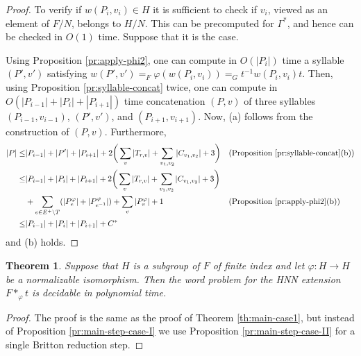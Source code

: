 \documentclass[12pt,oneside]{amsart}
\newtheorem{theorem}{Theorem}[section]
\theoremstyle{definition}
\theoremstyle{case}
\newcommand{\sasha}[1]{\todo[inline,color=green]{\footnotesize SU: #1}}
\newcommand{\hanwen}[1]{\todo[inline,color=cyan]{\footnotesize Hanwen: #1}}
\begin{document}
\begin{proof}
To verify if $w(P_i,v_i) \in H$ it is sufficient to check if $v_i$, 
viewed as an element of $F/N$, belongs to $H/N$.
This can be precomputed for $\Gamma^\ast$, and hence can be checked in 
$O(1)$ time. Suppose that it is the case.

Using Proposition \ref{pr:apply-phi2}, one can compute in $O(|P_i|)$ time
a syllable $(P',v')$ satisfying
$w(P',v') =_F \varphi(w(P_i,v_i)) =_G t^{-1} w(P_{i},v_{i}) t$.
Then, using Proposition \ref{pr:syllable-concat} twice, one can compute 
in $O(|P_{i-1}|+|P_{i}|+|P_{i+1}|)$ time
concatenation $(P,v)$ of 
three syllables $(P_{i-1},v_{i-1})$, $(P',v')$, 
and $(P_{i+1},v_{i+1})$.
Now, (a) follows from the construction of $(P,v)$.
Furthermore,
\begin{align*}
|P| \le& |P_{i-1}| + |P'| + |P_{i+1}| +
2\bigg(\sum_{v} |T_{r,v}| + \sum_{v_1,v_2} |C_{v_1,v_2}|+ 3\bigg)
&&\mbox{(Proposition \ref{pr:syllable-concat}(b))}\\
\le & |P_{i-1}| + |P_i| + |P_{i+1}| +
2\bigg(\sum_{v} |T_{r,v}| + \sum_{v_1,v_2} |C_{v_1,v_2}|+ 3\bigg)\\
&+\sum_{e\in E^+\setminus T} (|P_e^\varphi|+ |P_{e^{-1}}^\varphi|) 
+\sum_v |P_v^\varphi|+1
&&\mbox{(Proposition \ref{pr:apply-phi2}(b))}\\
\le& |P_{i-1}| + |P_i| + |P_{i+1}| + C^\ast
\end{align*}
and (b) holds.
\end{proof}



\begin{theorem}\label{th:main-case2}
Suppose that $H$ is a subgroup of $F$ of finite index 
and let $\varphi:H\to H$ be a normalizable isomorphism.
Then the word problem for the HNN extension $F\ast_\varphi t$
is decidable in polynomial time.
\end{theorem}

\begin{proof}
The proof is the same as the proof of Theorem \ref{th:main-case1},
but instead of Proposition \ref{pr:main-step-case-I}
we use Proposition \ref{pr:main-step-case-II} 
for a single Britton reduction step.
\end{proof}



\end{document}
